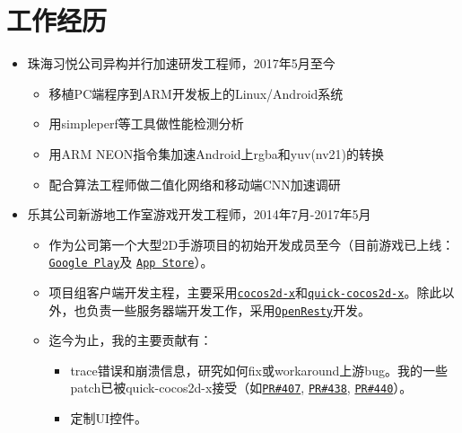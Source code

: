 \documentclass[letterpaper]{article}
\begin{document}
\section*{工作经历}
\begin{itemize}
    \item 珠海习悦公司异构并行加速研发工程师，2017年5月至今
        \begin{itemize}
            \item 移植PC端程序到ARM开发板上的Linux/Android系统
            \item 用simpleperf等工具做性能检测分析
            \item 用ARM NEON指令集加速Android上rgba和yuv(nv21)的转换
            \item 配合算法工程师做二值化网络和移动端CNN加速调研
        \end{itemize}
    \item 乐其公司新游地工作室游戏开发工程师，2014年7月-2017年5月
        \begin{itemize}
            \item 作为公司第一个大型2D手游项目的初始开发成员至今（目前游戏已上线：
                \href{https://play.google.com/store/apps/details?id=com.game168.yysg}{\tt Google Play}及
                \href{https://itunes.apple.com/us/app/ye-ye-san-guo/id976517523?mt=8}{\tt App Store}）。
            \item 项目组客户端开发主程，主要采用\href{http://cocos2d-x.org/}{\tt cocos2d-x}和\href{https://github.com/dualface/v3quick}{\tt quick-cocos2d-x}。除此以外，也负责一些服务器端开发工作，采用\href{https://github.com/openresty/openresty}{\tt OpenResty}开发。
            \item 迄今为止，我的主要贡献有：
                \begin{itemize}
                    \item trace错误和崩溃信息，研究如何fix或workaround上游bug。我的一些patch已被quick-cocos2d-x接受（如\href{https://github.com/dualface/v3quick/pull/407}{\tt PR\#407}, \href{https://github.com/dualface/v3quick/pull/438}{\tt PR\#438}, \href{https://github.com/dualface/v3quick/pull/440}{\tt PR\#440}）。
                    \item 定制UI控件。

\end{itemize}
\end{itemize}
\end{itemize}
\end{document}
